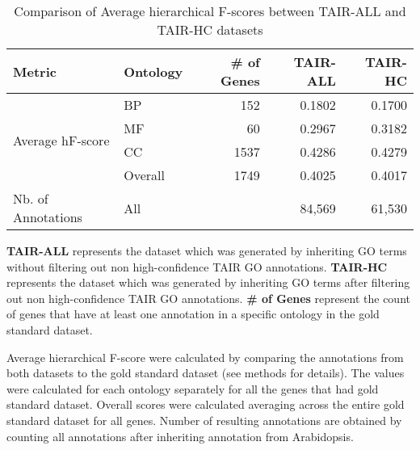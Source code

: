 \begin{table}[h]
  \centering
  \begin{tabularx}{\textwidth}{lXrrr}
    \hline
    \bf{Metric} & \textbf {Ontology} & \bf{\# of Genes}  & \textbf {TAIR-ALL} & \textbf {TAIR-HC} \\
    \hline
    \multirow{4}{*}{Average hF-score}
    & BP&152 & 0.1802 & 0.1700 \\
    & MF&60 & 0.2967 & 0.3182 \\
    & CC&1537 & 0.4286 & 0.4279 \\
    & Overall&1749 & 0.4025 & 0.4017 \\
    \hline
    Nb. of Annotations & All &  & 84,569 & 61,530 \\
    \hline
  \end{tabularx}

  \raggedright
  \caption{Comparison of Average hierarchical F-scores between TAIR-ALL and TAIR-HC datasets}\label{table:tair-rbh}
  \textbf{TAIR-ALL} represents the dataset which was generated by inheriting GO terms without filtering out non high-confidence TAIR GO annotations.
  \textbf{TAIR-HC} represents the dataset which was generated by inheriting GO terms after filtering out non high-confidence TAIR GO annotations.
  \textbf{\# of Genes} represent the count of  genes that have at least one annotation in a specific ontology in the gold standard dataset.

  Average hierarchical F-score were calculated by comparing the annotations from both datasets to the gold standard dataset (see methods for details). The values were calculated for each ontology separately for all the genes that had gold standard dataset. Overall scores were calculated averaging across the entire gold standard dataset for all genes. Number of resulting annotations are obtained by counting all annotations after inheriting annotation from Arabidopsis.
\end{table}
